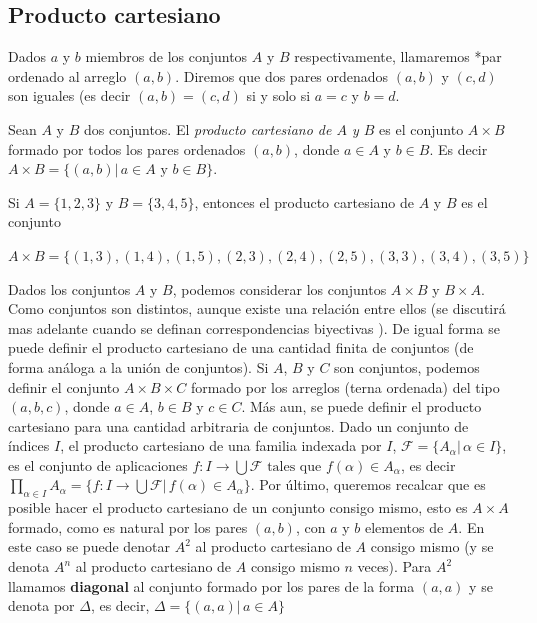 \documentclass[12pt,]{krantz}
\theoremstyle{definition}
\theoremstyle{definition}
\theoremstyle{definition}
\theoremstyle{remark}
\let\BeginKnitrBlock\begin \let\EndKnitrBlock\end
\begin{document}
\subsection{Producto cartesiano}\label{producto-cartesiano}

\BeginKnitrBlock{definition}
\protect\hypertarget{def:unnamed-chunk-16}{}{\label{def:unnamed-chunk-16}
}Dados \(a\) y \(b\) miembros de los conjuntos \(A\) y \(B\)
respectivamente, llamaremos *par ordenado al arreglo \((a,b)\). Diremos
que dos pares ordenados \((a,b)\) y \((c,d)\) son iguales (es decir
\((a,b)=(c,d)\) si y solo si \(a=c\) y \(b=d\).
\EndKnitrBlock{definition}

\BeginKnitrBlock{definition}
\protect\hypertarget{def:unnamed-chunk-17}{}{\label{def:unnamed-chunk-17}
}Sean \(A\) y \(B\) dos conjuntos. El \emph{producto cartesiano de \(A\)
y \(B\)} es el conjunto \(A\times B\) formado por todos los pares
ordenados \((a,b)\), donde \(a\in A\) y \(b\in B\). Es decir
\(A\times B=\{(a,b)| \, a\in A \mbox{ y } b\in B \}\).
\EndKnitrBlock{definition}

\BeginKnitrBlock{example}
\protect\hypertarget{exm:unnamed-chunk-18}{}{\label{exm:unnamed-chunk-18}
}Si \(A=\{1,2,3\}\) y \(B=\{3,4,5\}\), entonces el producto cartesiano
de \(A\) y \(B\) es el conjunto

\(A\times B=\{ (1,3), (1,4), (1,5), (2,3), (2,4), (2,5), (3,3), (3,4), (3,5)\}\)
\EndKnitrBlock{example}

\BeginKnitrBlock{remark}
{}Dados los conjuntos \(A\) y \(B\), podemos
considerar los conjuntos \(A\times B\) y \(B\times A\). Como conjuntos
son distintos, aunque existe una relación entre ellos (se discutirá mas
adelante cuando se definan correspondencias biyectivas ). De igual forma
se puede definir el producto cartesiano de una cantidad finita de
conjuntos (de forma análoga a la unión de conjuntos). Si \(A\), \(B\) y
\(C\) son conjuntos, podemos definir el conjunto \(A\times B\times C\)
formado por los arreglos (terna ordenada) del tipo \((a,b,c)\), donde
\(a\in A\), \(b\in B\) y \(c\in C\). Más aun, se puede definir el
producto cartesiano para una cantidad arbitraria de conjuntos. Dado un
conjunto de índices \(I\), el producto cartesiano de una familia
indexada por \(I\), \(\mathcal{F}=\{A_{\alpha}|\, \alpha\in I \}\), es
el conjunto de aplicaciones
\(f:I\longrightarrow \bigcup\mathcal{F} \mbox{ tales que } f(\alpha)\in A_{\alpha}\),
es decir
\(\prod_{\alpha \in I} A_{\alpha}=\{f:I\longrightarrow\bigcup \mathcal{F} |\, f(\alpha)\in A_{\alpha} \}\).
Por último, queremos recalcar que es posible hacer el producto
cartesiano de un conjunto consigo mismo, esto es \(A\times A\) formado,
como es natural por los pares \((a,b)\), con \(a\) y \(b\) elementos de
\(A\). En este caso se puede denotar \(A^{2}\) al producto cartesiano de
\(A\) consigo mismo (y se denota \(A^{n}\) al producto cartesiano de
\(A\) consigo mismo \(n\) veces). Para \(A^{2}\) llamamos
\textbf{diagonal} al conjunto formado por los pares de la forma
\((a,a)\) y se denota por \(\Delta\), es decir,
\(\Delta=\{(a,a)|\, a\in A \}\)
\EndKnitrBlock{remark}
\end{document}

